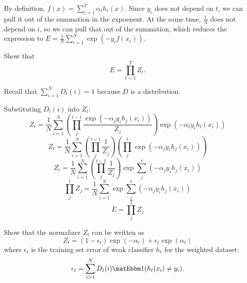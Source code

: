 \begin{solution}
    By definition, $f(x) = \sum\limits_{i=1}^T \alpha_{t}h_t(x)$. Since $y_i$ does not depend on $t$, we can pull it out of the summation in the expoenent. At the same time, $\frac{1}{N}$ does not depend on $i$, so we can pull that out of the summation, which reduces the expression to $E = \frac{1}{N} \sum\limits_{i=1}^N \exp(-y_{i}f(x_i))$.
\end{solution}

\problem[5]
Show that
$$E = \prod\limits_{t=1}^T Z_t.$$

\begin{hint}
	Recall that $\sum_{i = 1}^N D_t(i) = 1$ because $D$ is a distribution.
\end{hint}

\begin{solution}
    Substituting $D_t(i)$ into $Z_t$:
    \begin{equation}
        Z_t = \frac{1}{N}\sum\limits_{i=1}^N \left(\prod_j^{t-1}\frac{\exp{(-\alpha_jy_ih_j(x_i))}}{Z_j}\right)\exp(-\alpha_{t}y_{i}h_{t}(x_{i}))
    \end{equation}
    \begin{equation}
        Z_t = \frac{1}{N}\sum\limits_{i=1}^N \left(\prod_j^{t-1}\frac{1}{Z_j}\right)\left(\prod_j^{t}\exp{(-\alpha_jy_ih_j(x_i))}\right)
    \end{equation}
    \begin{equation}
        Z_t = \frac{1}{N}\sum\limits_{i=1}^N \left(\prod_j^{t-1}\frac{1}{Z_j}\right)\exp{\sum_j^t\left(-\alpha_jy_ih_j(x_i)\right)}
    \end{equation}
    \begin{equation}
        \prod_j^{t}Z_j=\frac{1}{N}\sum\limits_{i=1}^N\exp{\sum_j^t\left(-\alpha_jy_ih_j(x_i)\right)}
    \end{equation}
    \begin{equation}
        E = \prod_j^{T}Z_j
    \end{equation}
\end{solution}

\problem[5]
Show that the normalizer $Z_t$ can be written as
\[Z_t = (1 - \epsilon_t) \exp(-\alpha_t) + \epsilon_{t} \exp(\alpha_t)\]
where $\epsilon_t$ is the training set error of weak classifier $h_t$ for the weighted dataset:
\[\epsilon_t = \sum\limits_{i=1}^N D_t(i)\mathbbm1(h_t(x_i) \neq y_i).\]

